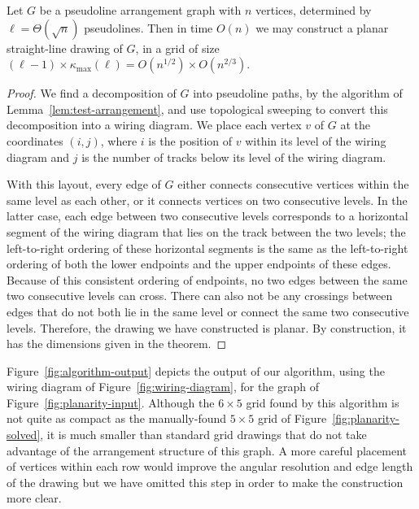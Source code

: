 \documentclass[oribibl]{llncs}
\newcommand{\maxklevel}{\kappa_{\max}}
\begin{document}
\begin{theorem}
\label{thm:draw}
Let $G$ be a pseudoline arrangement graph with $n$ vertices, determined by $\ell=\Theta(\sqrt n)$ pseudolines. Then in time $O(n)$ we may construct a planar straight-line drawing of $G$, in a grid of size $(\ell-1)\times\maxklevel(\ell)=O(n^{1/2})\times O(n^{2/3})$.
\end{theorem}

\begin{proof}
We find a decomposition of $G$ into pseudoline paths, by the algorithm of Lemma~\ref{lem:test-arrangement}, and use topological sweeping to convert this decomposition into a wiring diagram. We place each vertex $v$ of $G$ at the coordinates $(i,j)$, where $i$ is the position of $v$ within its level of the wiring diagram and $j$ is the number of tracks below its level of the wiring diagram.

With this layout, every edge of $G$ either connects consecutive vertices within the same level as each other, or it connects vertices on two consecutive levels. In the latter case, each edge between two consecutive levels corresponds to a horizontal segment of the wiring diagram that lies on the track between the two levels; the left-to-right ordering of these horizontal segments is the same as the left-to-right ordering of both the lower endpoints and the upper endpoints of these edges. Because of this consistent ordering of endpoints, no two edges between the same two consecutive levels can cross. There can also not be any crossings between edges that do not both lie in the same level or connect the same two consecutive levels. Therefore, the drawing we have constructed is planar. By construction, it has the dimensions given in the theorem.
\end{proof}

Figure~\ref{fig:algorithm-output} depicts the output of our algorithm, using the wiring diagram of Figure~\ref{fig:wiring-diagram}, for the graph of Figure~\ref{fig:planarity-input}.
Although the $6\times 5$ grid found by this algorithm is not quite as compact as the manually-found $5\times 5$ grid of Figure~\ref{fig:planarity-solved}, it is much smaller than standard grid drawings that do not take advantage of the arrangement structure of this graph. A more careful placement of vertices within each row would improve the angular resolution and edge length of the drawing but we have omitted this step in order to make the construction more clear.
\end{document}
